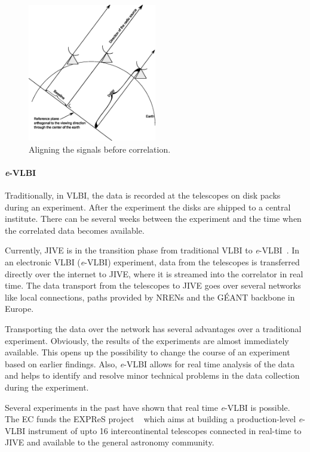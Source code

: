 \begin{figure}
  \centering 
  \includegraphics[width=0.5\textwidth]{img/VLBI.eps}
  \caption{Aligning the signals before correlation.}
  \label{fig:correlation_diagram}
\end{figure}

\paragraph{{\it e}-VLBI}
Traditionally, in VLBI, the data is recorded at the telescopes on disk
packs during an experiment. After the experiment the disks are shipped
to a central institute. There can be several weeks between the
experiment and the time when the correlated data becomes available.

Currently, JIVE is in the transition phase from traditional VLBI to
{\it e}-VLBI~\cite{szomoru-2004}. In an electronic VLBI ({\it e}-VLBI)
experiment, data from the telescopes is transferred directly over the
internet to JIVE, where it is streamed into the correlator in real
time. The data transport from the telescopes to JIVE goes over several
networks like local connections, paths provided by NRENs and the
G\'EANT backbone in Europe.

Transporting the data over the network has several advantages over a
traditional experiment. Obviously, the results of the experiments are
almost immediately available. This opens up the possibility to change
the course of an experiment based on earlier findings. Also, {\it
  e}-VLBI allows for real time analysis of the data and helps to
identify and resolve minor technical problems in the data collection
during the experiment.

Several experiments in the past have shown that real time {\it e}-VLBI
is possible. The EC funds the EXPReS project%
~\cite{EXPReS} which aims at building a production-level {\it e}-VLBI
instrument of upto 16 intercontinental telescopes connected in
real-time to JIVE and available to the general astronomy community.

